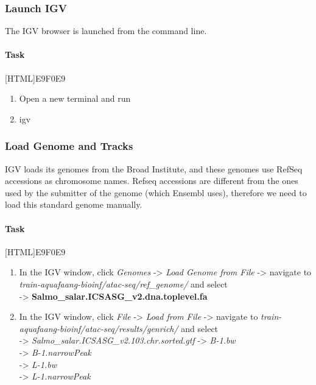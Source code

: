 \documentclass[12pt]{article}
\begin{document}
		\subsubsection{Launch IGV}
			The IGV browser is launched from the command line. 
			
				\paragraph{Task}
			
			[HTML]{E9F0E9}{\parbox{\linewidth}{%
					\begin{enumerate}
						\item  Open a new terminal and run
						\item  igv
					\end{enumerate}
			}}
			
			
		\subsubsection{Load Genome and Tracks}
			IGV loads its genomes from the Broad Institute, and these genomes use RefSeq accessions as chromosome names. 
			Refseq accessions are different from the ones used by the submitter of the genome (which Ensembl uses), therefore we need to load this standard genome manually.
			
			\paragraph{Task}
			
				[HTML]{E9F0E9}{\parbox{\linewidth}{%
					\begin{enumerate}
						\item In the IGV window, click \textit{Genomes} -> \textit{Load Genome from File} -> navigate to  \textit{train-aquafaang-bioinf/atac-seq/ref\_genome/} and select \\
						-> \textbf{Salmo\_salar.ICSASG\_v2.dna.toplevel.fa} 
						\item In the IGV window, click \textit{File} -> \textit{Load from File} -> navigate to \textit{train-aquafaang-bioinf/atac-seq/results/genrich/} and select\\
						-> \textit{Salmo\_salar.ICSASG\_v2.103.chr.sorted.gtf}
						-> \textit{B-1.bw} \\
						-> \textit{B-1.narrowPeak} \\
						-> \textit{L-1.bw} \\
						-> \textit{L-1.narrowPeak}
					\end{enumerate}
				}}
		
\end{document}
